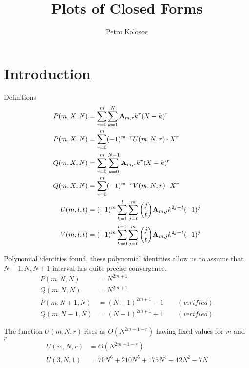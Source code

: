 \documentclass[12pt,letterpaper,oneside,reqno]{amsart}
\title[Plots of Closed Forms]
{Plots of Closed Forms}
\author[Petro Kolosov]{Petro Kolosov}
\newcommand \coeffA [3][A] {{\mathbf{#1}} \sb{#2,#3}}
\newcommand \polynomialP [4][P]{{#1}(#2,#3,#4)}
\newcommand \polynomialQ [4][Q]{{#1}(#2,#3,#4)}
\begin{document}
    \begin{abstract}
        
    \end{abstract}

    \maketitle

    \tableofcontents


    \section{Introduction}\label{sec:introduction}
    Definitions
    \begin{align*}
        \polynomialP{m}{X}{N} &= \sum_{r=0}^{m} \sum_{k=1}^{N} \coeffA{m}{r} k^r (X-k)^r \\
        \polynomialP{m}{X}{N} &= \sum_{r=0}^{m} (-1)^{m-r} U(m, N, r) \cdot X^{r} \\
        \polynomialQ{m}{X}{N} &= \sum_{r=0}^{m} \sum_{k=0}^{N-1} \coeffA{m}{r} k^r (X-k)^r \\
        \polynomialQ{m}{X}{N} &= \sum_{r=0}^{m} (-1)^{m-r} V(m, N, r) \cdot X^{r} \\
        U(m, l, t) &= (-1)^m \sum_{k=1}^{l} \sum_{j=t}^{m} \binom{j}{t} \coeffA{m}{j} k^{2j-t} (-1)^j \\
        V(m, l, t) &= (-1)^m \sum_{k=0}^{l-1}  \sum_{j=t}^{m} \binom{j}{t} \coeffA{m}{j} k^{2j-t} (-1)^j
    \end{align*}

    Polynomial identities found, these polynomial identities allow us to assume that $N-1, N, N+1$ interval
    has quite precise convergence.
    \begin{align*}
        \polynomialP{m}{N}{N} &= N^{2m+1} \\
        \polynomialQ{m}{N}{N} &= N^{2m+1} \\
        \polynomialP{m}{N+1}{N} &= (N+1)^{2m+1} - 1 \quad \quad (verified) \\
        \polynomialQ{m}{N-1}{N} &= (N-1)^{2m+1} + 1 \quad \quad (verified)
    \end{align*}

    The function $U(m, N, r)$ rises as $O(N^{2m+1-r})$ having fixed values for $m$ and $r$
    \begin{align*}
        U(m, N, r) &= O(N^{2m+1-r}) \\
        U(3, N, 1) &= 70 N^6+210 N^5+175 N^4-42 N^2-7 N
    \end{align*}
\end{document}
